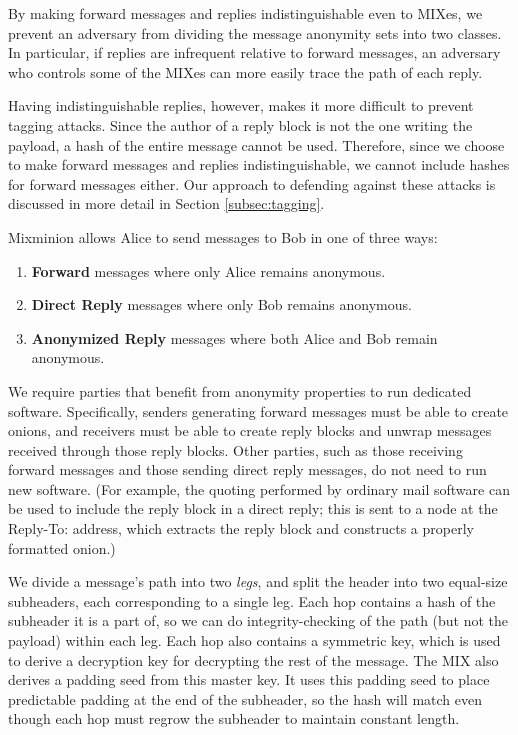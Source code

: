 \documentclass{llncs}
\begin{document}
By making forward messages and replies indistinguishable even to MIXes,
we prevent an
adversary from dividing the message anonymity sets into two classes. In
particular, if replies are infrequent relative to forward messages,
an adversary who controls some of the MIXes can more easily trace the
path of each reply.

Having indistinguishable replies, however, makes it more difficult to
prevent tagging attacks.  Since the author of a reply block is not the
one writing the payload, a hash of the entire message cannot be used.
Therefore, since we choose to make forward messages and replies
indistinguishable, we cannot include hashes for forward messages either.
Our approach to defending against these attacks is discussed in more
detail in Section \ref{subsec:tagging}.

Mixminion allows Alice to send messages to Bob in one of three ways:

\begin{enumerate}
\item \textbf{Forward} messages where only Alice remains anonymous.
\item \textbf{Direct Reply} messages where only Bob remains anonymous.
\item \textbf{Anonymized Reply} messages where both Alice and Bob
   remain anonymous.
\end{enumerate}

We require parties that benefit from anonymity properties to run dedicated
software.  Specifically, senders generating forward messages must be able
to create onions, and receivers must be able to create reply blocks
and unwrap messages received through those reply blocks. Other parties,
such as those receiving forward messages and those sending direct reply
messages, do not need to run new software. (For example, the quoting
performed by ordinary mail software can be used to include the reply
block in a direct reply; this is sent to a node at the Reply-To:
address, which extracts the reply block and constructs a properly
formatted onion.)

We divide a message's path into two \emph{legs}, and split the header
into two equal-size subheaders, each corresponding to a single leg.
Each hop contains a hash of the subheader it is a part of, so we can do
integrity-checking of the path (but not the payload) within each leg.
Each hop also contains a symmetric key, which is used to derive a
decryption key for decrypting the rest of the message. The MIX also
derives a padding seed from this master key. It uses this padding seed
to place
predictable padding at the end of the subheader, so the hash will
match even though each hop must regrow the subheader to maintain
constant length.
\end{document}
